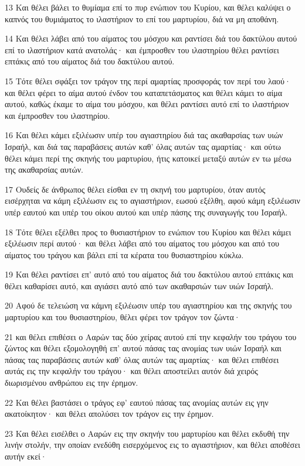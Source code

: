 \par 13 Και θέλει βάλει το θυμίαμα επί το πυρ ενώπιον του Κυρίου, και θέλει καλύψει ο καπνός του θυμιάματος το ιλαστήριον το επί του μαρτυρίου, διά να μη αποθάνη.
\par 14 Και θέλει λάβει από του αίματος του μόσχου και ραντίσει διά του δακτύλου αυτού επί το ιλαστήριον κατά ανατολάς· και έμπροσθεν του ιλαστηρίου θέλει ραντίσει επτάκις από του αίματος διά του δακτύλου αυτού.
\par 15 Τότε θέλει σφάξει τον τράγον της περί αμαρτίας προσφοράς τον περί του λαού· και θέλει φέρει το αίμα αυτού ένδον του καταπετάσματος και θέλει κάμει το αίμα αυτού, καθώς έκαμε το αίμα του μόσχου, και θέλει ραντίσει αυτό επί το ιλαστήριον και έμπροσθεν του ιλαστηρίου.
\par 16 Και θέλει κάμει εξιλέωσιν υπέρ του αγιαστηρίου διά τας ακαθαρσίας των υιών Ισραήλ, και διά τας παραβάσεις αυτών καθ' όλας αυτών τας αμαρτίας· και ούτω θέλει κάμει περί της σκηνής του μαρτυρίου, ήτις κατοικεί μεταξύ αυτών εν τω μέσω της ακαθαρσίας αυτών.
\par 17 Ουδείς δε άνθρωπος θέλει είσθαι εν τη σκηνή του μαρτυρίου, όταν αυτός εισέρχηται να κάμη εξιλέωσιν εις το αγιαστήριον, εωσού εξέλθη, αφού κάμη εξιλέωσιν υπέρ εαυτού και υπέρ του οίκου αυτού και υπέρ πάσης της συναγωγής του Ισραήλ.
\par 18 Τότε θέλει εξέλθει προς το θυσιαστήριον το ενώπιον του Κυρίου και θέλει κάμει εξιλέωσιν περί αυτού· και θέλει λάβει από του αίματος του μόσχου και από του αίματος του τράγου και βάλει επί τα κέρατα του θυσιαστηρίου κύκλω.
\par 19 Και θέλει ραντίσει επ' αυτό από του αίματος διά του δακτύλου αυτού επτάκις και θέλει καθαρίσει αυτό, και αγιάσει αυτό από των ακαθαρσιών των υιών Ισραήλ.
\par 20 Αφού δε τελειώση να κάμνη εξιλέωσιν υπέρ του αγιαστηρίου και της σκηνής του μαρτυρίου και του θυσιαστηρίου, θέλει φέρει τον τράγον τον ζώντα·
\par 21 και θέλει επιθέσει ο Ααρών τας δύο χείρας αυτού επί την κεφαλήν του τράγου του ζώντος και θέλει εξομολογηθή επ' αυτού πάσας τας ανομίας των υιών Ισραήλ και πάσας τας παραβάσεις αυτών καθ' όλας αυτών τας αμαρτίας· και θέλει επιθέσει αυτάς εις την κεφαλήν του τράγου· και θέλει αποστείλει αυτόν διά χειρός διωρισμένου ανθρώπου εις την έρημον.
\par 22 Και θέλει βαστάσει ο τράγος εφ' εαυτού πάσας τας ανομίας αυτών εις γην ακατοίκητον· και θέλει απολύσει τον τράγον εις την έρημον.
\par 23 Και θέλει εισέλθει ο Ααρών εις την σκηνήν του μαρτυρίου και θέλει εκδυθή την λινήν στολήν, την οποίαν ενεδύθη εισερχόμενος εις το αγιαστήριον, και θέλει αποθέσει αυτήν εκεί·
